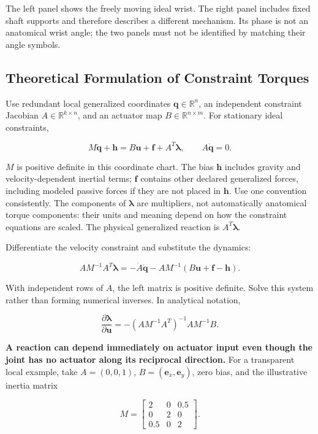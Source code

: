 \documentclass[
  11pt,
]{article}
\begin{document}
The left panel shows the freely moving ideal wrist. The right panel
includes fixed shaft supports and therefore describes a different
mechanism. Its phase is not an anatomical wrist angle; the two panels
must not be identified by matching their angle symbols.

\subsection{Theoretical Formulation of Constraint
Torques}\label{theoretical-formulation-of-constraint-torques}

Use redundant local generalized coordinates \(\mathbf q\in\mathbb R^n\),
an independent constraint Jacobian \(A\in\mathbb R^{k\times n}\), and an
actuator map \(B\in\mathbb R^{n\times m}\). For stationary ideal
constraints,

\[
M\ddot{\mathbf q}+\mathbf h
=B\mathbf u+\mathbf f+A^T\boldsymbol\lambda,
\qquad A\dot{\mathbf q}=0.
\]

\(M\) is positive definite in this coordinate chart. The bias
\(\mathbf h\) includes gravity and velocity-dependent inertial terms;
\(\mathbf f\) contains other declared generalized forces, including
modeled passive forces if they are not placed in \(\mathbf h\). Use one
convention consistently. The components of \(\boldsymbol\lambda\) are
multipliers, not automatically anatomical torque components: their units
and meaning depend on how the constraint equations are scaled. The
physical generalized reaction is \(A^T\boldsymbol\lambda\).

Differentiate the velocity constraint and substitute the dynamics:

\[
AM^{-1}A^T\boldsymbol\lambda
=-\dot A\dot{\mathbf q}-AM^{-1}(B\mathbf u+\mathbf f-\mathbf h).
\]

With independent rows of \(A\), the left matrix is positive definite.
Solve this system rather than forming numerical inverses. In analytical
notation,

\[
\frac{\partial\boldsymbol\lambda}{\partial\mathbf u}
=-(AM^{-1}A^T)^{-1}AM^{-1}B.
\]

\textbf{A reaction can depend immediately on actuator input even though
the joint has no actuator along its reciprocal direction.} For a
transparent local example, take \(A=(0,0,1)\),
\(B=(\mathbf e_x,\mathbf e_y)\), zero bias, and the illustrative inertia
matrix

\[
M=\begin{bmatrix}2&0&0.5\\0&2&0\\0.5&0&2\end{bmatrix}.
\]
\end{document}

